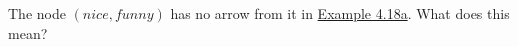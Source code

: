 The node $(nice,funny)$ has no arrow from it in \href{doc/1 math/Seven Sketches in Compositionality/Chapter 4: Co-design/2 Enriched profunctors/3 Back to co-design diagrams/1 Movie constraints}{Example 4.18a}. What does this mean?
